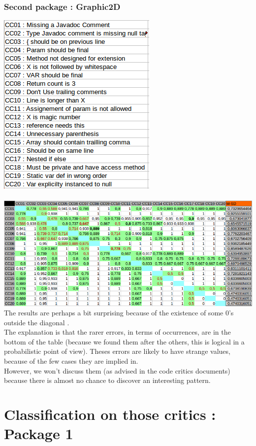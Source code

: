 \documentclass{article}
\begin{document}
\subsubsection{Second package : Graphic2D}
\includegraphics[scale=0.5]{names01.png} \\ \\
\includegraphics[scale=0.5]{01.png} \\

The results are perhaps a bit surprising because of the existence of some 0's outside the diagonal .\\

The explanation is that the rarer errors, in terms of occurrences, are in the bottom of the table (because we found them after the others, this is logical in a probabilistic point of view). Theses errors are likely to have strange values, because of the few cases they are implied in. \\
However, we won't discuss them (as advised in the code critics documents) because there is almost no chance to discover an interesting pattern.


\section{Classification on those critics : Package 1}
\end{document}
